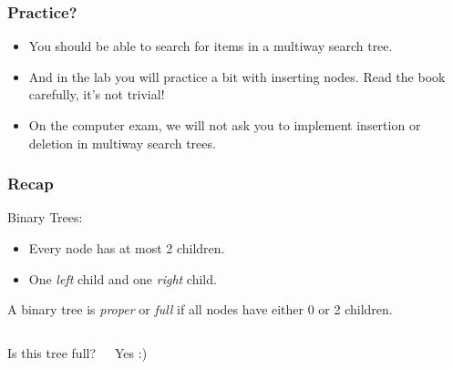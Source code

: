 \begin{frame}
	\frametitle{Practice?}
	
			\begin{itemize}
				\item You should be able to search for items in a multiway search tree.
				\item And in the lab you will practice a bit with inserting nodes. Read the book carefully, it's not trivial!
				\item On the computer exam, we will not ask you to implement insertion or deletion in multiway search trees.
			\end{itemize}
\end{frame}

\begin{frame}
	\frametitle{Recap}
	
Binary Trees:
			\begin{itemize}
				\item Every node has at most 2 children.
					
				\item One \textit{left} child and one \textit{right} child.
			\end{itemize}
		
		A binary tree is \textit{proper} or \textit{full} if all nodes have either 0 or 2 children.
		
		\begin{columns}[T]
				
				
				Is this tree full?
				
				Yes :)	
		\end{columns}
\end{frame}

